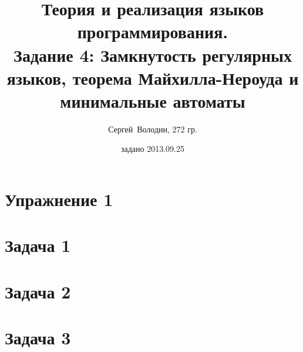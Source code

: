 \documentclass[a4paper]{article}
\title{Теория и реализация языков программирования.\\Задание 4: Замкнутость регулярных языков, теорема Майхилла-Нероуда и минимальные автоматы}
\date{задано 2013.09.25}
\author{Сергей~Володин, 272 гр.}
\begin{document}
\maketitle
\section*{Упражнение 1}
\section*{Задача 1}
\section*{Задача 2}
\section*{Задача 3}
\end{document}
